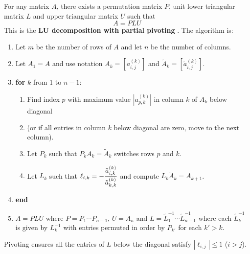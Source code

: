 \begin{theorem}
For any matrix $A$, there exists a permutation matrix $P$, unit lower triangular matrix $L$ and upper triangular matrix $U$ such that
$$
A = PLU
$$
This is the {\bf LU decomposition with partial pivoting} \cite[p.72]{MH}. The algorithm is:
\begin{enumerate}
\item[] Let $m$ be the number of rows of $A$ and let $n$ be the number of columns.
\item[] Let $A_1 = A$ and use notation $A_k = \left[ a_{i,j}^{(k)} \right]$ and $\tilde{A}_k = \left[ \tilde{a}_{i,j}^{(k)} \right]$.
\item[] {\bf for} $k$ from 1 to $n-1$:
\begin{enumerate}
\item[] Find index $p$ with maximum value $\left| a_{p,k}^{(k)} \right|$ in column $k$ of $A_k$ below diagonal
\item[] (or if all entries in column $k$ below diagonal are zero, move to the next column).
\item[] Let $P_k$ such that $P_k A_k = \tilde{A}_k$ switches rows $p$ and $k$.
\item[] Let $L_k$ such that $\displaystyle \ell_{i,k} = - \frac{\tilde{a}^{(k)}_{i,k}}{\tilde{a}^{(k)}_{k,k}}$ and compute $L_k \tilde{A}_k = A_{k+1}$.
\end{enumerate}
\item[] {\bf end}
\item[] $A = PLU$ where $P=P_1 \cdots P_{n-1}$, $U = A_n$ and $L = \tilde{L}_1^{-1} \cdots \tilde{L}_{n-1}^{-1}$ where each $\tilde{L}_k^{-1}$ is given by $L_k^{-1}$ with entries permuted in order by $P_{k'}$ for each $k' > k$.
\end{enumerate}
\end{theorem}

\begin{note}
Pivoting ensures all the entries of $L$ below the diagonal satisfy $| \ell_{i,j} | \leq 1$ ($i > j$).
\end{note}

